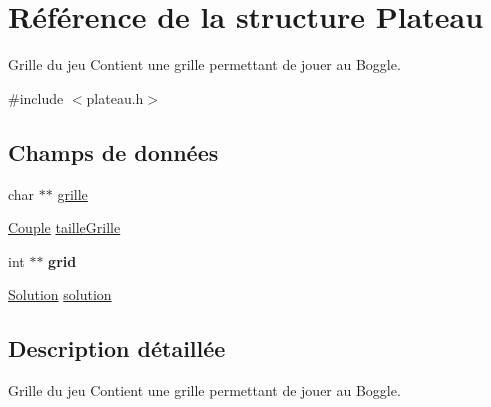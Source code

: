 \hypertarget{structPlateau}{\section{Référence de la structure Plateau}
\label{structPlateau}
}


Grille du jeu Contient une grille permettant de jouer au Boggle.  




{\ttfamily \#include $<$plateau.\-h$>$}

\subsection*{Champs de données}
\begin{DoxyCompactItemize}
\item 
char $\ast$$\ast$ \hyperlink{structPlateau_a42411aa44b78d298681030ce3461f686}{grille}
\item 
\hyperlink{structCouple}{Couple} \hyperlink{structPlateau_af86602008c1cfce98187fd9b9b4e50ce}{taille\-Grille}
\item 
\hypertarget{structPlateau_aeb94d618db5af1b25a4f64042a4ad771}{int $\ast$$\ast$ {\bfseries grid}}\label{structPlateau_aeb94d618db5af1b25a4f64042a4ad771}

\item 
\hyperlink{structSolution}{Solution} \hyperlink{structPlateau_aed88af50891b17edcd3ba97d7098dfde}{solution}
\end{DoxyCompactItemize}


\subsection{Description détaillée}
Grille du jeu Contient une grille permettant de jouer au Boggle. 

